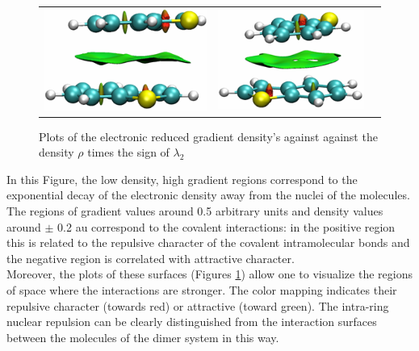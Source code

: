 \begin{figure}[H]
\begin{center}
\begin{tabular}{c c c}
					\includegraphics{image/image/P1-F861} & \includegraphics{image/image/P1-F862} & \\
				\end{tabular}
			\end{center}
			\caption{Plots of the electronic reduced gradient density's against against the density $\rho$ times the sign of $\lambda_{2}$} \label{P1-F8}
		\end{figure}
		
		In this Figure, the low density, high gradient regions correspond to the exponential decay of the electronic density away from the nuclei of the molecules. The regions of gradient values around 0.5 arbitrary units and density values around $\pm$ 0.2 au correspond to the covalent interactions: in the positive region this is related to the repulsive character of the covalent intramolecular bonds and the negative region is correlated with attractive character.\\
		
		Moreover, the plots of these surfaces (Figures \ref{P1-F8}) allow one to visualize the regions of space where the interactions are stronger. The color mapping indicates their repulsive character (towards red) or attractive (toward green). The intra-ring nuclear repulsion can be clearly distinguished from the interaction surfaces between the molecules of the dimer system in this way.\\
		
